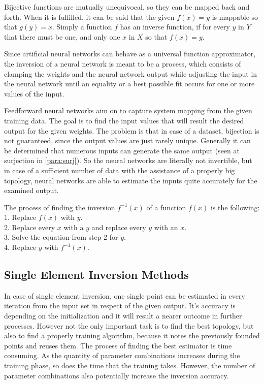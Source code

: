 Bijective functions are mutually unequivocal, so they can be mapped back and forth. When it is fulfilled, it can be said that the given $f(x) = y$ is mappable so that $g(y) = x$. Simply a function $f$ has an inverse function, if for every $y$ in $Y$ that there must be one, and only one $x$ in $X$ so that $f(x) = y$.\bigskip

Since artificial neural networks can behave as a universal function approximator, the inversion of a neural network is meant to be a process, which consists of clamping the weights and the neural network output while adjusting the input in the neural network until an equality or a best possible fit occurs for one or more values of the input. \medskip

Feedforward neural networks aim on to capture system mapping from the given training data. The goal is to find the input values that will result the desired output for the given weights. The problem is that in case of a dataset, bijection is not guaranteed, since the output values are just rarely unique. Generally it can be determined that numerous inputs can generate the same output (seen at surjection in \ref{para:surj}). So the neural networks are literally not invertible, but in case of a sufficient number of data with the assistance of a properly big topology, neural networks are able to estimate the inputs quite accurately for the examined output.

\bigskip \noindent The process of finding the inversion $f^{-1}(x)$ of a function $f(x)$ is the following:\\
1. Replace $f(x)$ with $y$.\\
2. Replace every $x$ with a $y$ and replace every $y$ with an $x$. \\
3. Solve the equation from step 2 for $y$. \\
4. Replace $y$ with $f^{-1}(x)$. 



\subsection{Single Element Inversion Methods}

In case of single element inversion, one single point can be estimated in every iteration from the input set in respect of the given output. It's accuracy is depending on the initialization and it will result a nearer outcome in further processes. However not the only important task is to find the best topology, but also to find a properly training algorithm, because it notes the previously founded points and reuses them. The process of finding the best estimator is time consuming. As the quantity of parameter combinations increases during the training phase, so does the time that the training takes. However, the number of parameter combinations also potentially increase the inversion accuracy.\bigskip

